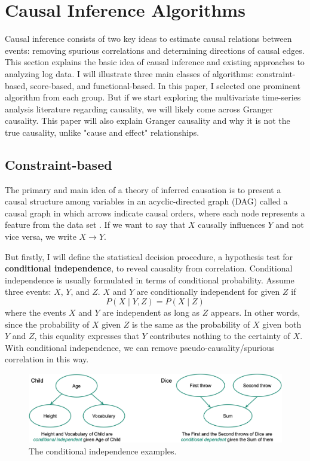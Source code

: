 \section{Causal Inference Algorithms}
\label{sec:5}
Causal inference consists of two key ideas to estimate causal relations between events: removing spurious correlations and determining directions of causal edges. This section explains the basic idea of causal inference and existing approaches to analyzing log data. I will illustrate three main classes of algorithms: constraint-based, score-based, and functional-based. In this paper, I selected one prominent algorithm from each group. But if we start exploring the multivariate time-series analysis literature regarding causality, we will likely come across Granger causality. This paper will also explain Granger causality and why it is not the true causality, unlike "cause and effect" relationships.
\subsection{Constraint-based}
The primary and main idea of a theory of inferred causation is to present a causal structure among variables in an acyclic-directed graph (DAG) called a causal graph in which arrows indicate causal orders, where each node represents a feature from the data set \cite{pearl2009causality}. If we want to say that $X$ causally influences $Y$ and not vice versa, we write $X \rightarrow Y$. \newline

But firstly, I will define the statistical decision procedure, a hypothesis test for \textbf{conditional independence}, to reveal causality from correlation. Conditional independence is usually formulated in terms of conditional probability. Assume three events: $X$, $Y$, and $Z$. $X$ and $Y$ are conditionally independent for given $Z$ if
\begin{equation}
P(X \mid Y, Z)=P(X \mid Z)
\end{equation}
where the events $X$ and $Y$ are independent as long as $Z$ appears. In other words, since the probability of $X$ given $Z$ is the same as the probability of $X$ given both $Y$ and $Z$, this equality expresses that $Y$ contributes nothing to the certainty of $X$. With conditional independence, we can remove pseudo-causality/spurious correlation in this way. \newline
\begin{figure}[ht]
\centering
    \label{fig:ci-example}
    \includegraphics[width=\textwidth]{figures/ci_example.png}
    \caption{The conditional independence examples.}
\end{figure}

